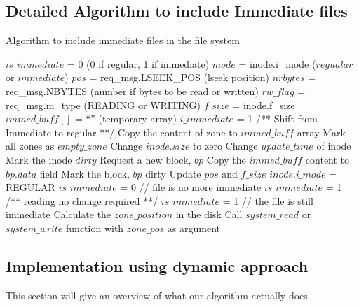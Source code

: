 \subsection{Detailed Algorithm to include Immediate files}
\begin{algorithm}
\caption{Algorithm to include immediate files in the file system}
\label{IFSAlcorithm}
\begin{algorithmic}[1]
\State $is\_immediate$ = 0 (0 if regular, 1 if immediate)
\State $mode$ = inode.i\_mode ($regualar$ or $immediate$) 
\State $pos$ = req\_msg.LSEEK\_POS (lseek position)
\State $nrbytes$ = req\_msg.NBYTES (number if bytes to be read or written)
\State $rw\_flag$ = req\_msg.m\_type (READING or WRITING)
\State $f\_size$ = inode.f\_size
\State $immed\_buff[]$ = ``'' (temporary array)
\State $i\_immediate$ = 1
\Else 
\State /** Shift from Immediate  to regular **/
\State Copy the content of zone to $immed\_buff$ array
\State Mark all zones as $empty\_zone$
\State Change $inode.size$ to zero
\State Change $update\_time$ of inode
\State Mark the inode $dirty$
\State Request a new block, $bp$
\State Copy the $immed\_buff$ content to $bp.data$ field
\State Mark the block, $bp$ dirty
\State Update $pos$ and $f\_size$
\State $inode.i\_mode$ = REGULAR
\State $is\_immediate$ = 0 // file is no more immediate
\EndIf
\Else 
\State $is\_immediate$ = 1
\EndIf
\Else 
\State /** reading no change required **/
\State $is\_immediate$ = 1
\EndIf
\EndIf
{} // the file is still immediate
\State Calculate the $zone\_position$ in the disk
\State Call $system\_read$ or $system\_write$ function with $zone\_pos$ as
argument
\EndIf
\EndProcedure
\end{algorithmic}
\end{algorithm} 

\newpage

\subsection{Implementation using dynamic approach}
This section will give an overview of what our algorithm actually does.

